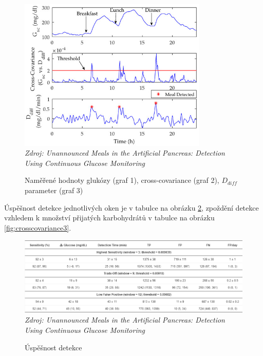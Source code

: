 \begin{figure}[H]
\caption{Naměřené hodnoty glukózy (graf 1), cross-covariance (graf 2), $D_{diff}$ parameter (graf 3)}
\label{fig:crosscovariance1}
\centering
\includegraphics[width=0.8\textwidth]{img/analyza/crosscovariance1.jpg}\\
\textit{Zdroj: Unannounced Meals in the Artificial Pancreas: Detection Using Continuous Glucose Monitoring \citep{Analyza.CrossCovariance}}
\end{figure}

Úspěšnost detekce jednotlivých oken je v tabulce na obrázku \ref{fig:crosscovariance2}, zpoždění detekce vzhledem k množství přijatých karbohydrátů v tabulce na obrázku \ref{fig:crosscovariance3}.

\begin{figure}[H]
\caption{Úspěšnost detekce}
\label{fig:crosscovariance2}
\includegraphics[width=1\textwidth]{img/analyza/crosscovariance2.png}\\
\textit{Zdroj: Unannounced Meals in the Artificial Pancreas: Detection Using Continuous Glucose Monitoring \citep{Analyza.CrossCovariance}}
\end{figure}

